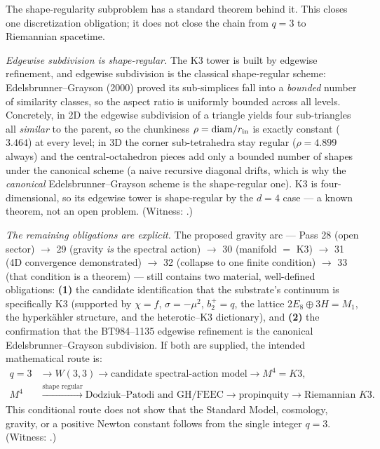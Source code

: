 \documentclass[11pt]{article}
\begin{document}
The shape-regularity subproblem has a standard theorem behind it. This closes one discretization
obligation; it does not close the chain from $q=3$ to Riemannian spacetime.

\emph{Edgewise subdivision is shape-regular.} The K3 tower is built by edgewise refinement, and
edgewise subdivision is the classical shape-regular scheme: Edelsbrunner--Grayson (2000) proved its
sub-simplices fall into a \emph{bounded} number of similarity classes, so the aspect ratio is
uniformly bounded across all levels. Concretely, in 2D the edgewise subdivision of a triangle yields
four sub-triangles all \emph{similar} to the parent, so the chunkiness $\rho=\mathrm{diam}/r_{\rm in}$
is exactly constant ($3.464$) at every level; in 3D the corner sub-tetrahedra stay regular
($\rho=4.899$ always) and the central-octahedron pieces add only a bounded number of shapes under
the canonical scheme (a naive recursive diagonal drifts, which is why the \emph{canonical}
Edelsbrunner--Grayson scheme is the shape-regular one). K3 is four-dimensional, so its edgewise tower
is shape-regular by the $d=4$ case --- a known theorem, not an open problem. (Witness:
.)

\emph{The remaining obligations are explicit.} The proposed gravity arc --- Pass 28 (open sector)
$\to$ 29 (gravity \emph{is} the spectral action) $\to$ 30 (manifold $=$ K3) $\to$ 31 (4D convergence
demonstrated) $\to$ 32 (collapse to one finite condition) $\to$ 33 (that condition is a theorem) ---
still contains two material, well-defined obligations: \textbf{(1)} the candidate identification that the substrate's
continuum is specifically K3 (supported by $\chi=f$, $\sigma=-\mu^2$, $b_2^+=q$, the lattice
$2E_8\oplus3H=M_1$, the hyperk\"ahler structure, and the heterotic--K3 dictionary), and
\textbf{(2)} the confirmation that the BT984--1135 edgewise refinement is the canonical
Edelsbrunner--Grayson subdivision. If both are supplied, the intended mathematical route is:
\[
\begin{aligned}
q{=}3&\to W(3,3)\to\text{candidate spectral-action model}\to M^4{=}K3,\\
M^4&\xrightarrow{\text{shape regular}}\text{Dodziuk--Patodi and GH/FEEC}
\to\text{propinquity}\to\text{Riemannian }K3.
\end{aligned}
\]
This conditional route does not show that the Standard Model, cosmology, gravity, or a positive
Newton constant follows from the single integer $q=3$.
(Witness: .)
\end{document}
